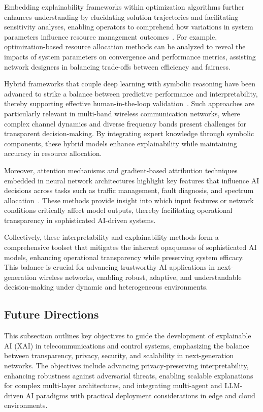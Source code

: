 \documentclass[sigconf]{acmart}
\begin{document}
Embedding explainability frameworks within optimization algorithms further enhances understanding by elucidating solution trajectories and facilitating sensitivity analyses, enabling operators to comprehend how variations in system parameters influence resource management outcomes~\cite{ref8,ref9}. For example, optimization-based resource allocation methods can be analyzed to reveal the impacts of system parameters on convergence and performance metrics, assisting network designers in balancing trade-offs between efficiency and fairness.

Hybrid frameworks that couple deep learning with symbolic reasoning have been advanced to strike a balance between predictive performance and interpretability, thereby supporting effective human-in-the-loop validation~\cite{ref12}. Such approaches are particularly relevant in multi-band wireless communication networks, where complex channel dynamics and diverse frequency bands present challenges for transparent decision-making. By integrating expert knowledge through symbolic components, these hybrid models enhance explainability while maintaining accuracy in resource allocation.

Moreover, attention mechanisms and gradient-based attribution techniques embedded in neural network architectures highlight key features that influence AI decisions across tasks such as traffic management, fault diagnosis, and spectrum allocation~\cite{ref14}. These methods provide insight into which input features or network conditions critically affect model outputs, thereby facilitating operational transparency in sophisticated AI-driven systems.

Collectively, these interpretability and explainability methods form a comprehensive toolset that mitigates the inherent opaqueness of sophisticated AI models, enhancing operational transparency while preserving system efficacy. This balance is crucial for advancing trustworthy AI applications in next-generation wireless networks, enabling robust, adaptive, and understandable decision-making under dynamic and heterogeneous environments.

\subsection{Future Directions}

This subsection outlines key objectives to guide the development of explainable AI (XAI) in telecommunications and control systems, emphasizing the balance between transparency, privacy, security, and scalability in next-generation networks. The objectives include advancing privacy-preserving interpretability, enhancing robustness against adversarial threats, enabling scalable explanations for complex multi-layer architectures, and integrating multi-agent and LLM-driven AI paradigms with practical deployment considerations in edge and cloud environments.
\end{document}
